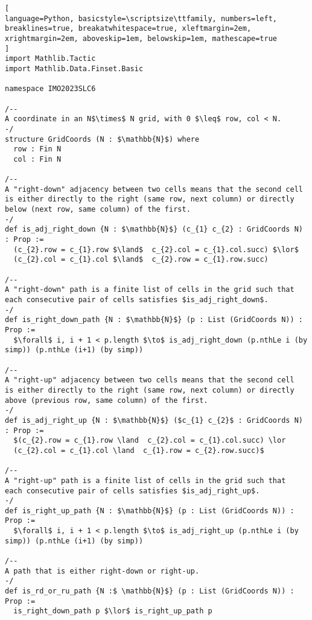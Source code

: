\begin{tcolorbox}[enhanced, breakable, rounded corners,
    colback=green!5!white, colframe=green!75!black,
    colbacktitle=green!85!black, fonttitle=\bfseries, coltitle=white, title=Lean Theorem for 2023 IMO Shortlist Combinatorics Problem 6]
\setlength{\parskip}{1em}
\begin{lstlisting}[
language=Python, basicstyle=\scriptsize\ttfamily, numbers=left, breaklines=true, breakatwhitespace=true, xleftmargin=2em, xrightmargin=2em, aboveskip=1em, belowskip=1em, mathescape=true
]
import Mathlib.Tactic
import Mathlib.Data.Finset.Basic

namespace IMO2023SLC6

/--
A coordinate in an N$\times$ N grid, with 0 $\leq$ row, col < N.
-/
structure GridCoords (N : $\mathbb{N}$) where
  row : Fin N
  col : Fin N

/--
A "right-down" adjacency between two cells means that the second cell
is either directly to the right (same row, next column) or directly
below (next row, same column) of the first.
-/
def is_adj_right_down {N : $\mathbb{N}$} (c_{1} c_{2} : GridCoords N) : Prop :=
  (c_{2}.row = c_{1}.row $\land$  c_{2}.col = c_{1}.col.succ) $\lor$
  (c_{2}.col = c_{1}.col $\land$  c_{2}.row = c_{1}.row.succ)

/--
A "right-down" path is a finite list of cells in the grid such that
each consecutive pair of cells satisfies $is_adj_right_down$.
-/
def is_right_down_path {N : $\mathbb{N}$} (p : List (GridCoords N)) : Prop :=
  $\forall$ i, i + 1 < p.length $\to$ is_adj_right_down (p.nthLe i (by simp)) (p.nthLe (i+1) (by simp))

/--
A "right-up" adjacency between two cells means that the second cell
is either directly to the right (same row, next column) or directly
above (previous row, same column) of the first.
-/
def is_adj_right_up {N : $\mathbb{N}$} ($c_{1} c_{2}$ : GridCoords N) : Prop :=
  $(c_{2}.row = c_{1}.row \land  c_{2}.col = c_{1}.col.succ) \lor
  (c_{2}.col = c_{1}.col \land  c_{1}.row = c_{2}.row.succ)$

/--
A "right-up" path is a finite list of cells in the grid such that
each consecutive pair of cells satisfies $is_adj_right_up$.
-/
def is_right_up_path {N : $\mathbb{N}$} (p : List (GridCoords N)) : Prop :=
  $\forall$ i, i + 1 < p.length $\to$ is_adj_right_up (p.nthLe i (by simp)) (p.nthLe (i+1) (by simp))

/--
A path that is either right-down or right-up.
-/
def is_rd_or_ru_path {N :$ \mathbb{N}$} (p : List (GridCoords N)) : Prop :=
  is_right_down_path p $\lor$ is_right_up_path p


\end{lstlisting}
\end{tcolorbox}
